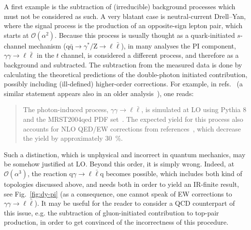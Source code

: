 A first example is the subtraction of (irreducible) background processes which must not be considered as such. A very blatant case
is neutral-current Drell--Yan, where the signal process is the production of an opposite-sign lepton pair, which starts
at $\mathcal O(\alpha^2)$. Because this process is usually thought
as a quark-initiated $s$-channel mechanism ($\mathrm{q} \bar{\mathrm{q}} \to \gamma^*/\mathrm{Z} \to \ell \bar{\ell}$), in many analyses the PI component,
$\gamma \gamma \to \ell \bar{\ell}$ in the $t$ channel, is considered a different process, and therefore as a background and subtracted.
The subtraction from the measured data is done by calculating the theoretical predictions of the double-photon initiated contribution, possibly including (ill-defined) higher-order
corrections. For example, in refs.~\cite{Aaboud:2017ffb,Aad:2016zzw} (a similar statement appears also in an older analysis~\cite{Aad:2013iua}), one reads:
\begin{quote}
The photon-induced process, $\gamma\gamma \to \ell \bar{\ell}$, is simulated at LO using Pythia 8
and the MRST2004qed PDF set~\cite{Martin:2004dh}. The expected yield for this process also accounts for 
NLO QED/EW corrections from references~\cite{Bardin:2012jk,Bondarenko:2013nu}, which decrease the yield by approximately \SI{30}{\percent}.
\end{quote}
Such a distinction, which is unphysical and incorrect in quantum mechanics, may be somehow justified at LO. Beyond this order, it is simply wrong.
Indeed, at $\mathcal O(\alpha^3)$, the reaction $\mathrm{q} \gamma \to \ell \bar{\ell} \mathrm{q}$ becomes possible, which
includes both kind of topologies discussed above, and needs both in order to yield an IR-finite result, see Fig.~\ref{fig:dy-pi} (as a consequence, one cannot speak of EW corrections to $\gamma \gamma \to \ell \bar{\ell}$). It may be useful for the reader to consider a QCD counterpart of this issue, 
e.g. the subtraction of gluon-initiated contribution to top-pair production, in order to get convinced of the incorrectness of this procedure.

